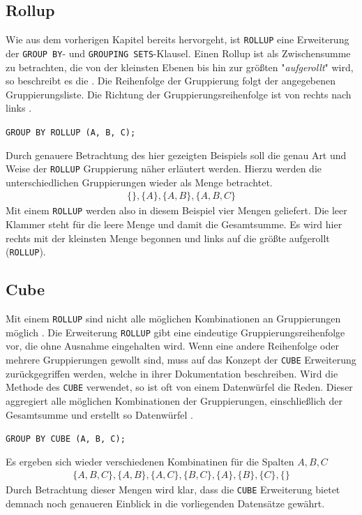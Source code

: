 \subsection{Rollup}
\label{subsec:rollup} Wie aus dem vorherigen Kapitel bereits hervorgeht, ist
\texttt{ROLLUP} eine Erweiterung der \texttt{GROUP BY}- und \texttt{GROUPING
SETS}-Klausel. Einen Rollup ist als Zwischensumme zu betrachten, die von der
kleinsten Ebenen bis hin zur größten "\textit{aufgerollt}" wird, so beschreibt
es die \citet{oracle99}. Die Reihenfolge der Gruppierung folgt der angegebenen
Gruppierungsliste. Die Richtung der Gruppierungsreihenfolge ist von rechts nach links
\citep[vgl.][]{oracle16}.
\begin{center}
	\texttt{GROUP BY ROLLUP (A, B, C);}
\end{center}
Durch genauere Betrachtung des hier gezeigten Beispiels soll die genau Art und Weise
der \texttt{ROLLUP} Gruppierung näher erläutert werden. Hierzu werden die unterschiedlichen
Gruppierungen wieder als Menge betrachtet.
\begin{align*}
	\{ \}, \{A\}, \{A, B\}, \{A, B, C\}
\end{align*}
Mit einem \texttt{ROLLUP} werden also in diesem Beispiel vier Mengen geliefert.
Die leer Klammer steht für die leere Menge und damit die Gesamtsumme. Es wird hier
rechts mit der kleinsten Menge begonnen und links auf die größte aufgerollt (\texttt{ROLLUP}).

\subsection{Cube}
\label{subsec:cube} Mit einem \texttt{ROLLUP} sind nicht alle möglichen Kombinationen
an Gruppierungen möglich \citep[vgl.][]{oracle99}. Die Erweiterung \texttt{ROLLUP}
gibt eine eindeutige Gruppierungsreihenfolge vor, die ohne Ausnahme eingehalten wird.
Wenn eine andere Reihenfolge oder mehrere Gruppierungen gewollt sind, muss auf das
Konzept der \texttt{CUBE} Erweiterung zurückgegriffen werden, welche \citet{oracle99}
in ihrer Dokumentation beschreiben. Wird die Methode des \texttt{CUBE} verwendet,
so ist oft von einem Datenwürfel die Reden. Dieser aggregiert alle möglichen
Kombinationen der Gruppierungen, einschließlich der Gesamtsumme und erstellt so Datenwürfel
\citep[vgl.][]{oracle99}.
\begin{center}
	\texttt{GROUP BY CUBE (A, B, C);}
\end{center}
Es ergeben sich wieder verschiedenen Kombinatinen für die Spalten $A, B, C$
\begin{align*}
	\{ A, B, C\}, \{A, B\}, \{A, C\}, \{B, C\}, \{A\}, \{B\}, \{C\}, \{ \}
\end{align*}
Durch Betrachtung dieser Mengen wird klar, dass die \texttt{CUBE} Erweiterung bietet
demnach noch genaueren Einblick in die vorliegenden Datensätze gewährt.
